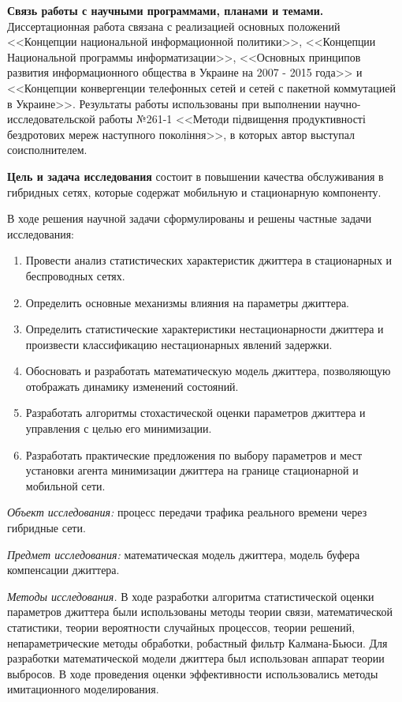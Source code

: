 \textbf{Связь работы с научными программами, планами и темами.} Диссертационная работа связана с реализацией основных положений <<Концепции национальной информационной политики>>, <<Концепции Национальной программы информатизации>>, <<Основных принципов развития информационного общества в Украине на 2007 - 2015 года>> и <<Концепции конвергенции телефонных сетей и сетей с пакетной коммутацией в Украине>>.
Результаты работы использованы при выполнении научно-исследовательской работы №261-1 <<Методи підвищення продуктивності бездротових мереж наступного покоління>>, в которых автор выступал соисполнителем.

\textbf{Цель и задача исследования} состоит в повышении качества обслуживания в гибридных сетях, которые содержат мобильную и стационарную компоненту.

В ходе решения научной задачи сформулированы и решены частные задачи исследования:
\begin{enumerate}
  \item Провести анализ статистических характеристик джиттера в стационарных и беспроводных сетях.
  \item Определить основные механизмы влияния на параметры джиттера.
  \item Определить статистические характеристики нестационарности джиттера и произвести классификацию нестационарных явлений задержки.
  \item Обосновать и разработать математическую модель джиттера, позволяющую отображать динамику изменений состояний.
  \item Разработать алгоритмы стохастической оценки параметров джиттера и управления с целью его минимизации.
  \item Разработать практические предложения по выбору параметров и мест установки агента минимизации джиттера на границе стационарной и мобильной сети.
\end{enumerate}

{\itshape Объект исследования:} процесс передачи трафика реального времени через гибридные сети.

{\itshape Предмет исследования:} математическая модель джиттера, модель буфера компенсации джиттера.

{\itshape Методы исследования.} 
В ходе разработки алгоритма статистической оценки параметров джиттера были использованы методы теории связи, математической статистики, теории вероятности случайных процессов, 
теории решений, непараметрические методы обработки, робастный фильтр Калмана-Бьюси. 
Для разработки математической модели джиттера был использован аппарат теории выбросов. 
В ходе проведения оценки эффективности использовались методы имитационного моделирования.


